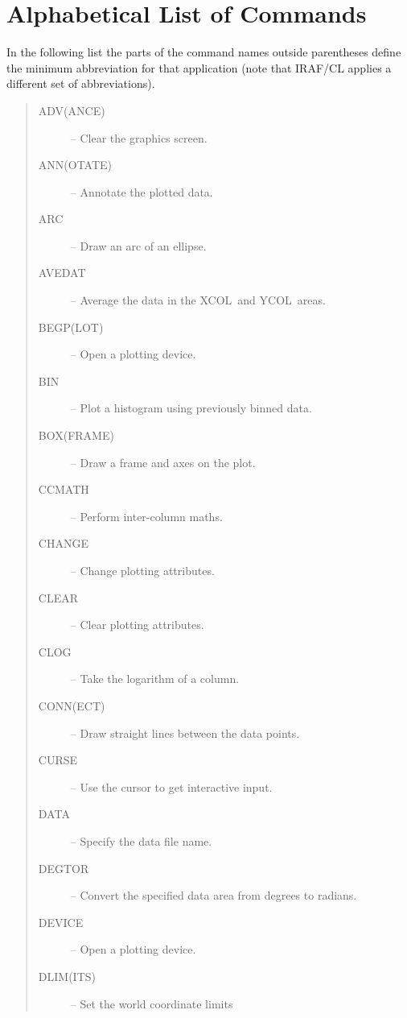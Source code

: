 \documentclass[twoside,11pt]{article}
\newcommand{\htmlref}[2]{#1}
\renewcommand{\_}{\texttt{\symbol{95}}}
\newcommand{\xcol}{{\sf XCOL}}
\newcommand{\ycol}{{\sf YCOL}}
\newcommand{\iref} [1]{\htmlref{#1}{#1}}
\newcommand{\iiref}[2]{\htmlref{#1}{#2}}
\begin{document}
%
%
\appendix

\newpage
\section{Alphabetical List of Commands}

In the following list the parts of the command names outside parentheses
define the minimum abbreviation for that application (note that IRAF/CL applies
a different set of abbreviations).
\small
\begin {quote}
\begin {description}
\item [\iiref{ADV(ANCE)}{ADVANCE}] -- Clear the graphics screen.
\item [\iiref{ANN(OTATE)}{ANNOTATE}] -- Annotate the plotted data.
\item [\iref{ARC}] -- Draw an arc of an ellipse.
\item [\iref{AVEDAT}] -- Average the data in the \xcol\ and \ycol\ areas.
\item [\iiref{BEGP(LOT)}{BEGPLOT}] -- Open a plotting device.
\item [\iref{BIN}] -- Plot a histogram using previously binned data.
\item [\iiref{BOX(FRAME)}{BOXFRAME}] -- Draw a frame and axes on the plot.
\item [\iref{CCMATH}] -- Perform inter-column maths.
\item [\iref{CHANGE}] -- Change plotting attributes.
\item [\iref{CLEAR}] -- Clear plotting attributes.
\item [\iref{CLOG}] -- Take the logarithm of a column.
\item [\iiref{CONN(ECT)}{CONNECT}] -- Draw straight lines between the
                                             data points.
\item [\iref{CURSE}] -- Use the cursor to get interactive input.
\item [\iref{DATA}] -- Specify the data file name.
\item [\iref{DEGTOR}] -- Convert the specified data area from degrees to
                         radians.
\item [\iref{DEVICE}] -- Open a plotting device.
\item [\iiref{DLIM(ITS)}{DLIMITS}] -- Set the world coordinate limits

\end{description}
\end{quote}
\end{document}
